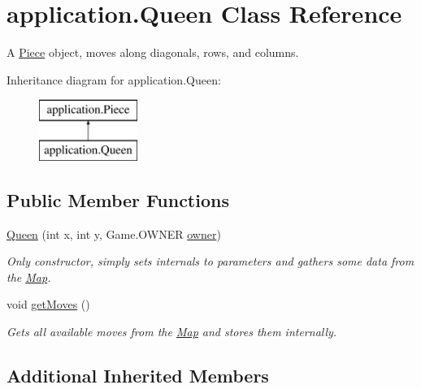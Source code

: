 \hypertarget{classapplication_1_1_queen}{\section{application.\+Queen Class Reference}
\label{classapplication_1_1_queen}
}


A \hyperlink{classapplication_1_1_piece}{Piece} object, moves along diagonals, rows, and columns.  


Inheritance diagram for application.\+Queen\+:\begin{figure}[H]
\begin{center}
\leavevmode
\includegraphics[height=2.000000cm]{classapplication_1_1_queen}
\end{center}
\end{figure}
\subsection*{Public Member Functions}
\begin{DoxyCompactItemize}
\item 
\hyperlink{classapplication_1_1_queen_a72921fc90666a1931a1e058d0ab63e85}{Queen} (int x, int y, Game.\+O\+W\+N\+E\+R \hyperlink{classapplication_1_1_piece_a724f116bd99a66a6f6bcc8b7b35de131}{owner})
\begin{DoxyCompactList}\small\item\em Only constructor, simply sets internals to parameters and gathers some data from the \hyperlink{classapplication_1_1_map}{Map}. \end{DoxyCompactList}\item 
\hypertarget{classapplication_1_1_queen_ab020c2fde4eeb0f6d5e6020434d90b1f}{void \hyperlink{classapplication_1_1_queen_ab020c2fde4eeb0f6d5e6020434d90b1f}{get\+Moves} ()}\label{classapplication_1_1_queen_ab020c2fde4eeb0f6d5e6020434d90b1f}

\begin{DoxyCompactList}\small\item\em Gets all available moves from the \hyperlink{classapplication_1_1_map}{Map} and stores them internally. \end{DoxyCompactList}\end{DoxyCompactItemize}
\subsection*{Additional Inherited Members}


